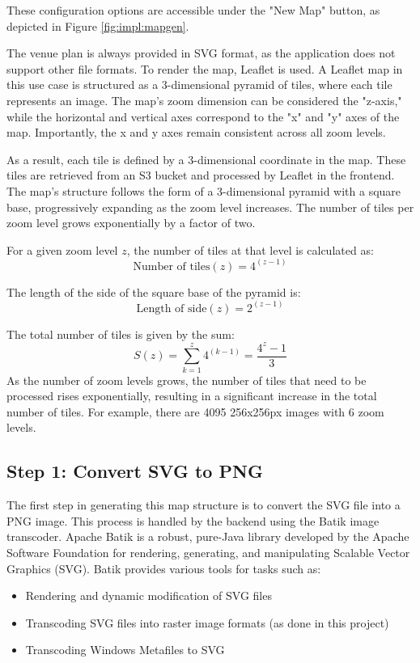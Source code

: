 These configuration options are accessible under the "New Map" button, as depicted in Figure \ref{fig:impl:mapgen}.

The venue plan is always provided in SVG format, as the application does not support other file formats. To render the map, Leaflet is used. A Leaflet map in this use case is structured as a 3-dimensional pyramid of tiles, where each tile represents an image. The map's zoom dimension can be considered the "z-axis," while the horizontal and vertical axes correspond to the "x" and "y" axes of the map. Importantly, the x and y axes remain consistent across all zoom levels.

As a result, each tile is defined by a 3-dimensional coordinate in the map. These tiles are retrieved from an S3 bucket and processed by Leaflet in the frontend. The map's structure follows the form of a 3-dimensional pyramid with a square base, progressively expanding as the zoom level increases. The number of tiles per zoom level grows exponentially by a factor of two.

For a given zoom level \( z \), the number of tiles at that level is calculated as:
\[
\text{Number of tiles}(z) = 4^{(z-1)}
\]

The length of the side of the square base of the pyramid is:
\[
\text{Length of side}(z) = 2^{(z-1)}
\]

The total number of tiles is given by the sum:
\[
S(z) = \sum_{k=1}^{z} 4^{(k-1)} = \frac{4^z - 1}{3}
\]
As the number of zoom levels grows, the number of tiles that need to be processed rises exponentially, resulting in a significant increase in the total number of tiles. For example, there are 4095 256x256px images with 6 zoom levels.

\subsection{Step 1: Convert SVG to PNG}

The first step in generating this map structure is to convert the SVG file into a PNG image. This process is handled by the backend using the Batik image transcoder. Apache Batik is a robust, pure-Java library developed by the Apache Software Foundation for rendering, generating, and manipulating Scalable Vector Graphics (SVG). Batik provides various tools for tasks such as:

\begin{itemize} \item Rendering and dynamic modification of SVG files \item Transcoding SVG files into raster image formats (as done in this project) \item Transcoding Windows Metafiles to SVG \end{itemize}

